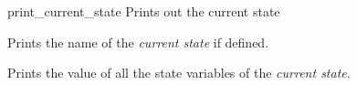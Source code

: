 \begin{nusmvCommand}{print\_current\_state} {Prints out the current state}


Prints the name of the \emph{current state} if defined.

\begin{cmdOpt}
 {Prints the value of all the state variables of the
\emph{current state}.}
\end{cmdOpt}

\end{nusmvCommand}

